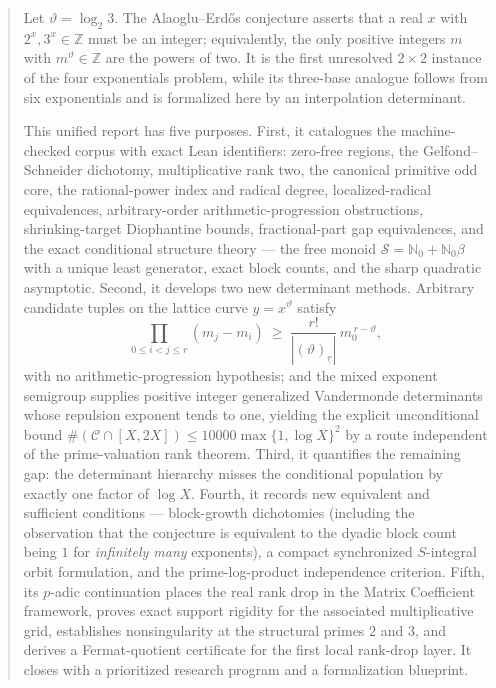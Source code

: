 \documentclass[11pt,oneside]{article}
\theoremstyle{definition}
\theoremstyle{remark}
\newcommand{\Nzero}{\mathbb N_0}
\newcommand{\Z}{\mathbb Z}
\newcommand{\thetaq}{\vartheta}
\newcommand{\Sol}{\mathcal S}
\newcommand{\Cand}{\mathcal C}
\newcommand{\fall}[2]{\left(#1\right)_{\!\underline{#2}}}
\begin{document}

\begin{abstract}
Let $\thetaq=\log_2 3$.  The Alaoglu--Erd\H{o}s conjecture asserts that a real $x$ with
$2^x,3^x\in\Z$ must be an integer; equivalently, the only positive integers $m$ with
$m^{\thetaq}\in\Z$ are the powers of two.  It is the first unresolved $2\times2$ instance of
the four exponentials problem, while its three-base analogue follows from six exponentials and
is formalized here by an interpolation determinant.

This unified report has five purposes.  First, it catalogues the machine-checked corpus with
exact Lean identifiers: zero-free regions, the Gelfond--Schneider dichotomy, multiplicative
rank two, the canonical primitive odd core, the rational-power index and radical degree,
localized-radical equivalences, arbitrary-order arithmetic-progression obstructions,
shrinking-target Diophantine bounds, fractional-part gap equivalences, and the exact
conditional structure theory --- the free monoid $\Sol=\Nzero+\Nzero\beta$ with a unique least
generator, exact block counts, and the sharp quadratic asymptotic.  Second, it develops two new
determinant methods.  Arbitrary candidate tuples on the lattice curve $y=x^{\thetaq}$ satisfy
\[
 \prod_{0\le i<j\le r}(m_j-m_i)\ \ge\ \frac{r!}{|\fall{\thetaq}{r}|}\,m_0^{\,r-\thetaq},
\]
with no arithmetic-progression hypothesis; and the mixed exponent semigroup supplies positive
integer generalized Vandermonde determinants whose repulsion exponent tends to one, yielding
the explicit unconditional bound $\#(\Cand\cap[X,2X])\le10000\max\{1,\log X\}^2$ by a route
independent of the prime-valuation rank theorem.  Third, it quantifies the remaining gap: the
determinant hierarchy misses the conditional population by exactly one factor of $\log X$.
Fourth, it records new equivalent and sufficient conditions --- block-growth dichotomies
(including the observation that the conjecture is equivalent to the dyadic block count being
$1$ for \emph{infinitely many} exponents), a compact synchronized $S$-integral orbit
formulation, and the prime-log-product independence criterion.  Fifth, its $p$-adic
continuation places the real rank drop in the Matrix Coefficient framework, proves exact
support rigidity for the associated multiplicative grid, establishes nonsingularity at the
structural primes $2$ and $3$, and derives a Fermat-quotient certificate for the first local
rank-drop layer.  It closes with a prioritized research program and a formalization blueprint.
\end{abstract}
\end{document}
